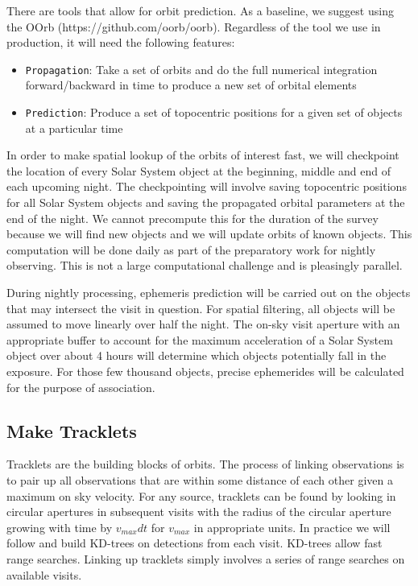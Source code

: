 There are tools that allow for orbit prediction.  As a baseline, we suggest using the OOrb (https://github.com/oorb/oorb).  Regardless of the tool we use in production, it will need the following features:
\begin{itemize}
\item \texttt{Propagation}: Take a set of orbits and do the full numerical integration forward/backward in time to produce a new set of orbital elements
\item \texttt{Prediction}: Produce a set of topocentric positions for a given set of objects at a particular time
\end{itemize}

In order to make spatial lookup of the orbits of interest fast, we will checkpoint the location of every Solar System object at the beginning, middle and end of each upcoming night.  The checkpointing will involve saving topocentric positions for all Solar System objects and saving the propagated orbital parameters at the end of the night.  We cannot precompute this for the duration of the survey because we will find new objects and we will update orbits of known objects.  This computation will be done daily as part of the preparatory work for nightly observing.  This is not a large computational challenge and is pleasingly parallel.

During nightly processing, ephemeris prediction will be carried out on the objects that may intersect the visit in question.  For spatial filtering, all objects will be assumed to move linearly over half the night.  The on-sky visit aperture with an appropriate buffer to account for the maximum acceleration of a Solar System object over about 4 hours will determine which objects potentially fall in the exposure.  For those few thousand objects, precise ephemerides will be calculated for the purpose of association.

\subsection{Make Tracklets}
\label{sec:acMakeTracklets}
Tracklets are the building blocks of orbits.  The process of linking observations is to pair up all observations that are within some distance of each other given a maximum on sky velocity.  For any source, tracklets can be found by looking in circular apertures in subsequent visits with the radius of the circular aperture growing with time by $v_{max}dt$ for $v_{max}$ in appropriate units.  In practice we will follow \cite{2007ASPC..376..395K} and build KD-trees on detections from each visit.  KD-trees allow fast range searches.  Linking up tracklets simply involves a series of range searches on available visits.

